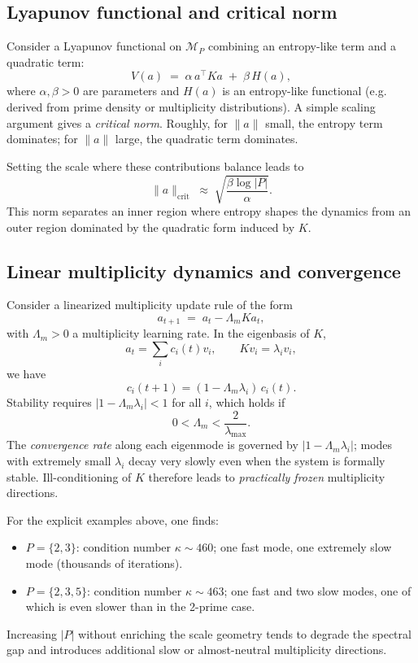 \documentclass[11pt]{article}
\begin{document}
\subsection{Lyapunov functional and critical norm}

Consider a Lyapunov functional on $\mathcal{M}_P$ combining an entropy-like term and a quadratic term:
\[
  V(a) \;=\; \alpha\, a^\top K a \;+\; \beta\, H(a),
\]
where $\alpha,\beta>0$ are parameters and $H(a)$ is an entropy-like functional (e.g. derived from prime density or multiplicity distributions). A simple scaling argument gives a \emph{critical norm}. Roughly, for $\|a\|$ small, the entropy term dominates; for $\|a\|$ large, the quadratic term dominates.

Setting the scale where these contributions balance leads to
\[
  \|a\|_{\text{crit}} \;\approx\; \sqrt{\frac{\beta\log|P|}{\alpha}}.
\]
This norm separates an inner region where entropy shapes the dynamics from an outer region dominated by the quadratic form induced by $K$.

\subsection{Linear multiplicity dynamics and convergence}

Consider a linearized multiplicity update rule of the form
\[
  a_{t+1} \;=\; a_t - \Lambda_m K a_t,
\]
with $\Lambda_m>0$ a multiplicity learning rate. In the eigenbasis of $K$,
\[
  a_t = \sum_i c_i(t) v_i,\qquad Kv_i=\lambda_i v_i,
\]
we have
\[
  c_i(t+1) = (1 - \Lambda_m \lambda_i)\, c_i(t).
\]
Stability requires $|1 - \Lambda_m \lambda_i| < 1$ for all $i$, which holds if
\[
  0 < \Lambda_m < \frac{2}{\lambda_{\max}}.
\]
The \emph{convergence rate} along each eigenmode is governed by $|1 - \Lambda_m \lambda_i|$; modes with extremely small $\lambda_i$ decay very slowly even when the system is formally stable. Ill-conditioning of $K$ therefore leads to \emph{practically frozen} multiplicity directions.

For the explicit examples above, one finds:
\begin{itemize}
  \item $P=\{2,3\}$: condition number $\kappa\sim 460$; one fast mode, one extremely slow mode (thousands of iterations).
  \item $P=\{2,3,5\}$: condition number $\kappa\sim 463$; one fast and two slow modes, one of which is even slower than in the 2-prime case.
\end{itemize}
Increasing $|P|$ without enriching the scale geometry tends to degrade the spectral gap and introduces additional slow or almost-neutral multiplicity directions.
\end{document}
